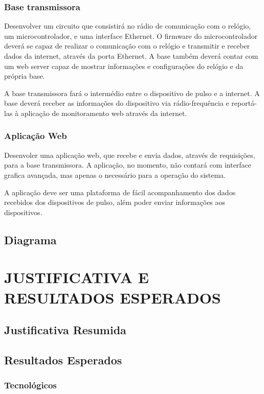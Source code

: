 \documentclass[a4paper]{article}
\begin{document}
\subsubsection{Base transmissora}
Desenvolver um circuito que consistirá no rádio de comunicação com o relógio, um microcontrolador, e uma interface Ethernet. O firmware do microcontrolador deverá se capaz de realizar o comunicação com o relógio e transmitir e receber dados da internet, através da porta Ethernet. A base também deverá contar com um web server capaz de mostrar informações e configurações do relógio e da própria base.


A base transmissora fará o intermédio entre o dispositivo de pulso e a internet. A base deverá receber as informações do dispositivo via rádio-frequência e reportá-las à aplicação de monitoramento web através da internet.

\subsubsection{Aplicação Web}
Desenvoler uma aplicação web, que recebe e envia dados, através de requisições, para a base transmissora. A aplicação, no momento, não contará com interface grafica avançada, mas apenas o necessário para a operação do sistema.

A aplicação deve ser uma plataforma de fácil acompanhamento dos dados recebidos dos dispositivos de pulso, além poder enviar informações aos dispositivos.

\subsection{Diagrama}

\section{JUSTIFICATIVA E RESULTADOS ESPERADOS}

\subsection{Justificativa Resumida}

\subsection{Resultados Esperados}

\subsubsection{Tecnológicos}
\end{document}
